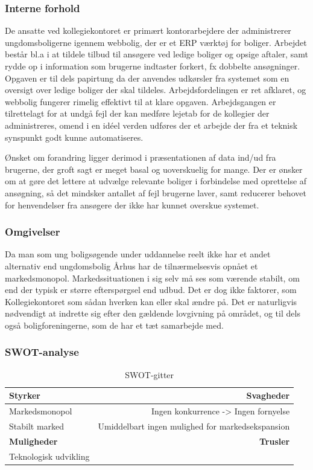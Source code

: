 \documentclass[12pt, a4paper]{report}
\begin{document}
  \subsubsection{Interne forhold}
De ansatte ved kollegiekontoret er primært kontorarbejdere der administrerer ungdomsboligerne igennem webbolig, der er et ERP værktøj for boliger. Arbejdet består bl.a i at tildele tilbud til ansøgere ved ledige boliger og opsige aftaler, samt rydde op i information som brugerne indtaster forkert, fx dobbelte ansøgninger. Opgaven er til dels papirtung da der anvendes udkørsler fra systemet som en oversigt over ledige boliger der skal tildeles. Arbejdsfordelingen er ret afklaret, og webbolig fungerer rimelig effektivt til at klare opgaven. Arbejdsgangen er tilrettelagt for at undgå fejl der kan medføre lejetab for de kollegier der administreres, omend i en idéel verden udføres der et arbejde der fra et teknisk synspunkt godt kunne automatiseres.

Ønsket om forandring ligger derimod i præsentationen af data ind/ud fra brugerne, der groft sagt er meget basal og uoverskuelig for mange. Der er ønsker om at gøre det lettere at udvælge relevante boliger i forbindelse med oprettelse af ansøgning, så det mindsker antallet af fejl brugerne laver, samt reducerer behovet for henvendelser fra ansøgere der ikke har kunnet overskue systemet.

  \subsubsection{Omgivelser}
Da man som ung boligsøgende under uddannelse reelt ikke har et andet alternativ end ungdomsbolig Århus har de tilnærmelsesvis opnået et markedsmonopol. Markedssituationen i sig selv må ses som værende stabilt, om end der typisk er større efterspørgsel end udbud. Det er dog ikke faktorer, som Kollegiekontoret som sådan hverken kan eller skal ændre på. Det er naturligvis nødvendigt at indrette sig efter den gældende lovgivning på området, og til dels også boligforeningerne, som de har et tæt samarbejde med.

\subsubsection{SWOT-analyse}
\begin{table}[ht]
\caption{SWOT-gitter}
\begin{tabular}{ | l | r | }
\hline
{\bf Styrker} & {\bf Svagheder} \\ \hline
Markedsmonopol & Ingen konkurrence -> Ingen fornyelse \\
Stabilt marked & Umiddelbart ingen mulighed for markedsekspansion \\ \hline
{\bf Muligheder} & {\bf Trusler} \\ \hline
Teknologisk udvikling & \\
\hline
\end{tabular}
\end{table}
\end{document}
